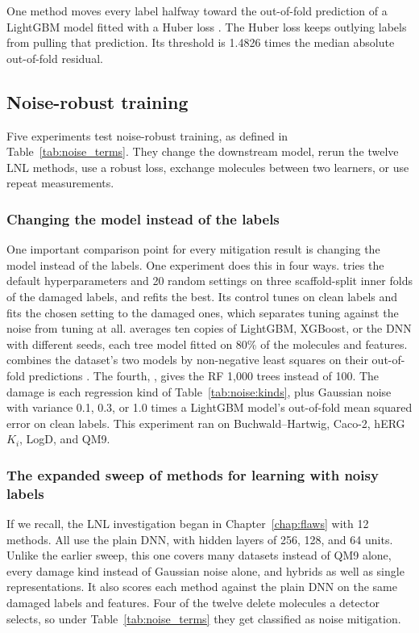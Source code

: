 One method moves every label halfway toward the out-of-fold prediction of a LightGBM model fitted with a Huber loss \citep{Huber1964}. The Huber loss keeps outlying labels from pulling that prediction. Its threshold is 1.4826 times the median absolute out-of-fold residual.

\subsection{Noise-robust training}\label{sec:noise:robust}

Five experiments test noise-robust training, as defined in Table~\ref{tab:noise_terms}. They change the downstream model, rerun the twelve LNL methods, use a robust loss, exchange molecules between two learners, or use repeat measurements.

\subsubsection{Changing the model instead of the labels}
One important comparison point for every mitigation result is changing the model instead of the labels. One experiment does this in four ways.  tries the default hyperparameters and 20 random settings on three scaffold-split inner folds of the damaged labels, and refits the best. Its control tunes on clean labels and fits the chosen setting to the damaged ones, which separates tuning against the noise from tuning at all.  averages ten copies of LightGBM, XGBoost, or the DNN with different seeds, each tree model fitted on 80\% of the molecules and features.  combines the dataset's two models by non-negative least squares on their out-of-fold predictions \citep{Breiman1996stacked}. The fourth, , gives the RF 1,000 trees instead of 100. The damage is each regression kind of Table~\ref{tab:noise:kinds}, plus Gaussian noise with variance 0.1, 0.3, or 1.0 times a LightGBM model's out-of-fold mean squared error on clean labels. This experiment ran on Buchwald--Hartwig, Caco-2, hERG $K_i$, LogD, and QM9.

\subsubsection{The expanded sweep of methods for learning with noisy labels}

If we recall, the LNL investigation began in Chapter~\ref{chap:flaws} with 12 methods. All use the plain DNN, with hidden layers of 256, 128, and 64 units. Unlike the earlier sweep, this one covers many datasets instead of QM9 alone, every damage kind instead of Gaussian noise alone, and hybrids as well as single representations. It also scores each method against the plain DNN on the same damaged labels and features. Four of the twelve delete molecules a detector selects, so under Table~\ref{tab:noise_terms} they get classified as noise mitigation. 

